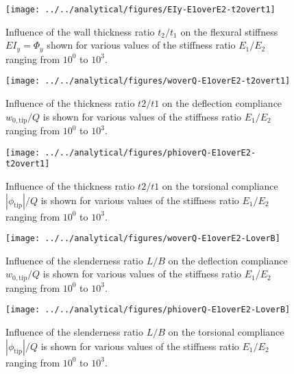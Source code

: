 \begin{figure}[!htpb] %
  \centering
  \texttt{[image: ../../analytical/figures/EIy-E1overE2-t2overt1]}
  \caption[Influence of the wall thickness ratio $t_2/t_1$ on the flexural stiffness $EI_y$]{Influence of the wall thickness ratio $t_2/t_1$ on the flexural stiffness $EI_y = \Phi_y$ shown for various values of the stiffness ratio $E_1/E_2$ ranging from $10^0$ to $10^3$. }\label{fig:EIy-E1overE2-t2overt1}
\end{figure}

\begin{figure}[!htpb] %
  \centering
  \texttt{[image: ../../analytical/figures/woverQ-E1overE2-t2overt1]}
  \caption[Influence of the thickness ratio $t2/t1$ on the deflection compliance]{Influence of the thickness ratio $t2/t1$ on the deflection compliance $w_{\mathrm{0,tip}} / Q$ is shown for various values of the stiffness ratio $E_1/E_2$ ranging from $10^0$ to $10^3$. }\label{fig:woverQ-E1overE2-t2overt1}
\end{figure}

\begin{figure}[!htpb] %
  \centering
  \texttt{[image: ../../analytical/figures/phioverQ-E1overE2-t2overt1]}
  \caption[Influence of the thickness ratio $t2/t1$ on the torsional compliance]{Influence of the thickness ratio $t2/t1$ on the torsional compliance $|\phi_{\mathrm{tip}}| / Q$ is shown for various values of the stiffness ratio $E_1/E_2$ ranging from $10^0$ to $10^3$. }\label{fig:phioverQ-E1overE2-t2overt1}
\end{figure}

\begin{figure}[!htpb] %
  \centering
  \texttt{[image: ../../analytical/figures/woverQ-E1overE2-LoverB]}
  \caption[Influence of the slenderness ratio $L/B$ on the deflection compliance]{Influence of the slenderness ratio $L/B$ on the deflection compliance $w_{\mathrm{0,tip}} / Q$ is shown for various values of the stiffness ratio $E_1/E_2$ ranging from $10^0$ to $10^3$. }\label{fig:woverQ-E1overE2-LoverB}
\end{figure}

\begin{figure}[!htpb] %
  \centering
  \texttt{[image: ../../analytical/figures/phioverQ-E1overE2-LoverB]}
  \caption[Influence of the slenderness ratio $L/B$ on the torsional compliance]{Influence of the slenderness ratio $L/B$ on the torsional compliance $|\phi_{\mathrm{tip}}| / Q$ is shown for various values of the stiffness ratio $E_1/E_2$ ranging from $10^0$ to $10^3$. }\label{fig:phioverQ-E1overE2-LoverB}
\end{figure}

